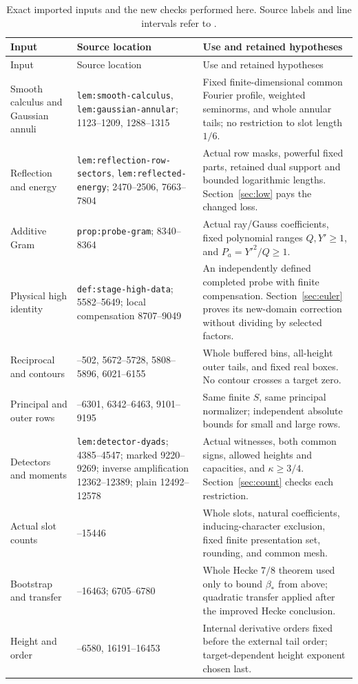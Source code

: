 \documentclass[11pt,a4paper]{article}
\theoremstyle{definition}
\newcommand{\bet}{\beta_*}
\newcommand{\src}[1]{\nolinkurl{#1}}
\begin{document}
\begingroup\small
\begin{longtable}{@{}>{\raggedright\arraybackslash}p{}>{\raggedright\arraybackslash}p{}>{\raggedright\arraybackslash}p{}@{}}
\caption{Exact imported inputs and the new checks performed here.
Source labels and line intervals refer to \cite{OAI}.}\label{tab:inputs}\\
\toprule
Input & Source location & Use and retained hypotheses\\
\midrule
\endfirsthead
\toprule Input & Source location & Use and retained hypotheses\\ \midrule
\endhead
\bottomrule\endfoot
Smooth calculus and Gaussian annuli &
\src{lem:smooth-calculus}, \src{lem:gaussian-annular};
1123--1209, 1288--1315 &
Fixed finite-dimensional common Fourier profile, weighted seminorms,
and whole annular tails; no restriction to slot length $1/6$.\\
Reflection and energy &
\src{lem:reflection-row-sectors}, \src{lem:reflected-energy};
2470--2506, 7663--7804 &
Actual row masks, powerful fixed parts, retained dual support and
bounded logarithmic lengths. Section~\ref{sec:low} pays the changed loss.\\
Additive Gram &
\src{prop:probe-gram}; 8340--8364 &
Actual ray/Gauss coefficients, fixed polynomial ranges $Q,Y'\ge1$,
and $P_a=Y'^2/Q\ge1$.\\
Physical high identity &
\src{def:stage-high-data}; 5582--5649;
local compensation 8707--9049 &
An independently defined completed probe with finite compensation.
Section~\ref{sec:euler}
proves its new-domain correction without dividing by selected factors.\\
Reciprocal and contours &
400--502, 5672--5728, 5808--5896, 6021--6155 &
Whole buffered bins, all-height outer tails, and fixed real boxes.
No contour crosses a target zero.\\
Principal and outer rows &
6174--6301, 6342--6463, 9101--9195 &
Same finite $S$, same principal normalizer; independent absolute bounds
for small and large rows.\\
Detectors and moments &
\src{lem:detector-dyads}; 4385--4547;
marked 9220--9269; inverse amplification 12362--12389;
plain 12492--12578 &
Actual witnesses, both common signs, allowed heights and capacities,
and $\kappa\ge3/4$. Section~\ref{sec:count} checks each restriction.\\
Actual slot counts &
15015--15446 &
Whole slots, natural coefficients, inducing-character exclusion,
fixed finite presentation set, rounding, and common mesh.\\
Bootstrap and transfer &
16455--16463; 6705--6780 &
Whole Hecke $7/8$ theorem used only to bound $\bet$ from above;
quadratic transfer applied after the improved Hecke conclusion.\\
Height and order &
6520--6580, 16191--16453 &
Internal derivative orders fixed before the external tail order;
target-dependent height exponent chosen last.\\
\end{longtable}
\endgroup
\end{document}

